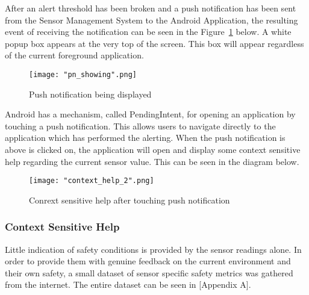 \documentclass{article}
\begin{document}
\noindent
After an alert threshold has been broken and a push notification has been sent from the Sensor Management System to the Android Application, the resulting event of receiving the notification can be seen in the Figure~\ref{fig:android_pn_displayed} below. A white popup box appears at the very top of the screen. This box will appear regardless of the current foreground application. 

\begin{figure}[H]
\centering
\texttt{[image: "pn\_showing".png]}
\caption{Push notification being displayed}
\label{fig:android_pn_displayed}
\end{figure}

\noindent
Android has a mechanism, called PendingIntent, for opening an application by touching a push notification. This allows users to navigate directly to the application which has performed the alerting. When the push notification is above is clicked on, the application will open and display some context sensitive help regarding the current sensor value. This can be seen in the diagram below.

\begin{figure}[H]
\centering
\texttt{[image: "context\_help\_2".png]}
\caption{Conrext sensitive help after touching push notification}
\label{fig:android_pn_help}
\end{figure}

\subsubsection{Context Sensitive Help}
Little indication of safety conditions is provided by the sensor readings alone. In order to provide them with genuine feedback on the current environment and their own safety, a small dataset of sensor specific safety metrics was gathered from the internet. The entire dataset can be seen in [Appendix A].\\\\
\end{document}
